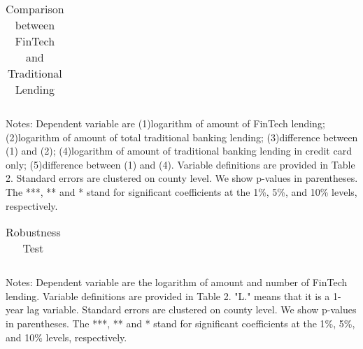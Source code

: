\documentclass[11pt, a4paper, leqno]{article}
\begin{document}
\begin{center}
\begin{table}[!h!] \caption{Comparison between FinTech and Traditional Lending \label{table:compare}}
\begin{threeparttable}
\begin{footnotesize}
\begin{tabularx}{\textwidth}{Xccccc}



\end{tabularx}
\end{footnotesize}
  \begin{tablenotes}
      \scriptsize
      \item Notes: Dependent variable are (1)logarithm of amount of FinTech lending; (2)logarithm of amount of total traditional banking lending; (3)difference between (1) and (2); (4)logarithm of amount of traditional banking lending in credit card only; (5)difference between (1) and (4). Variable definitions are provided in Table 2. Standard errors are clustered on county level. We show p-values in parentheses. The ***, ** and  * stand for significant coefficients at the 1\%, 5\%, and  10\% levels, respectively.
      \end{tablenotes}
\end{threeparttable}
\end{table}
\end{center}



\begin{center}
\begin{table}[!h!] \caption{Robustness Test \label{table:robustness}}
\begin{threeparttable}
\begin{footnotesize}
\begin{tabularx}{\textwidth}{Xrrrr}



\end{tabularx}
\end{footnotesize}
  \begin{tablenotes}
      \scriptsize
      \item Notes: Dependent variable are the logarithm of amount and number of FinTech lending. Variable definitions are provided in Table 2. "L." means that it is a 1-year lag variable. Standard errors are clustered on county level. We show p-values in parentheses. The ***, ** and  * stand for significant coefficients at the 1\%, 5\%, and  10\% levels, respectively.
      \end{tablenotes}
\end{threeparttable}
\end{table}
\end{center}
\end{document}
